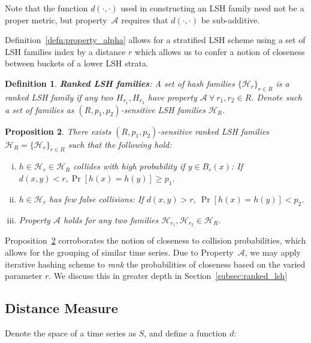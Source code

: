 \documentclass[a4paper]{article}
\newtheorem{definition}{Definition}
\newtheorem{proposition}[definition]{Proposition}
\begin{document}
Note that the function $d(\cdot,\cdot)$ used in constructing an LSH family need not be a proper metric, but property~$\mathscr{A}$ requires that $d(\cdot,\cdot)$ be sub-additive.

Definition~\ref{defn:property_alpha} allows for a stratified LSH scheme using a set of LSH families index by a distance $r$ which allows us to confer a notion of closeness between buckets of a lower LSH strata.

\begin{definition}\label{defn:ranked_lsh}
    \textbf{Ranked LSH families}:
    A set of hash families ${\{\mathcal{H}_r\}}_{r\in R}$ is a ranked LSH family if any two $H_{r_1}, H_{r_2}$ have property $\mathscr{A}~\forall~r_1, r_2 \in R$.
    Denote such a set of families as $(R,p_1, p_2)$-sensitive LSH families $\mathcal{H}_R$.
\end{definition}

\begin{proposition}\label{prop:ranked_lsh}
    There exists $(R, p_1, p_2)$-sensitive ranked LSH families $\mathcal{H}_R = {\{\mathcal{H}_r\}}_{r\in R}$ such that the following hold:
    \begin{enumerate}[(i)]
        \item\label{itm:first}
            $h \in \mathcal{H}_r \in \mathcal{H}_R$ collides with high probability if $y \in B_r(x)$: If $d(x,y) < r, \Pr[h(x) = h(y)] \ge p_1$.
        \item\label{itm:second}
            $h \in \mathcal{H}_r$ has few false collisions: If $d(x,y) > r$, $\Pr[h(x) = h(y)] < p_2$.
        \item\label{itm:rank_property}
            Property $\mathscr{A}$ holds for any two families $\mathcal{H}_{r_1}, \mathcal{H}_{r_2} \in \mathcal{H}_R$.
    \end{enumerate}
\end{proposition}

Proposition~\ref{prop:ranked_lsh} corroborates the notion of closeness to collision probabilities, which allows for the grouping of similar time series.
Due to Property~$\mathscr{A}$, we may apply iterative hashing scheme to \textit{rank} the probabilities of closeness based on the varied parameter $r$.
We discuss this in greater depth in Section~\ref{subsec:ranked_lsh}

\subsection{Distance Measure}
Denote the space of a time series as $S$, and define a function $d$:
\end{document}
